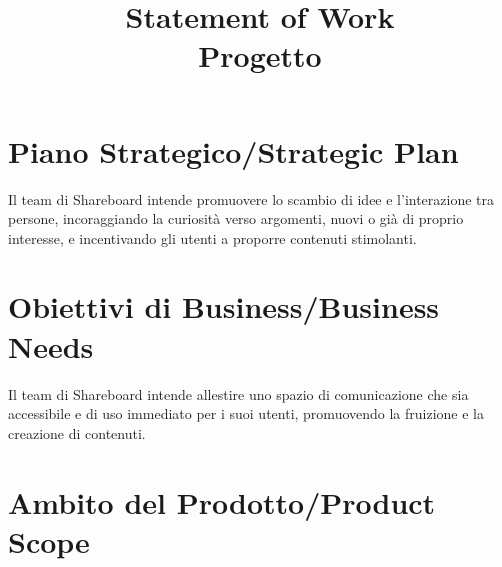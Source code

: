 \documentclass[12pt]{article}
\title{Statement of Work\\Progetto}
\author{\presentatoda}
\begin{document}
\maketitle

\begin{versionhistory}
\end{versionhistory}
\clearpage

\section{Piano Strategico/Strategic Plan}
  Il team di Shareboard intende promuovere lo scambio di idee e l’interazione tra persone, incoraggiando la curiosità verso argomenti, nuovi o già di proprio interesse, e incentivando gli utenti a proporre contenuti stimolanti.
  
  \section{Obiettivi di Business/Business Needs}
  Il team di Shareboard intende allestire uno spazio di comunicazione che sia accessibile e di uso immediato per i suoi utenti, promuovendo la fruizione e la creazione di contenuti.
  
  \section{Ambito del Prodotto/Product Scope}
  
\end{document}
